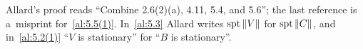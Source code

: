 \begin{remark}
    \label{rem:5.6}
    Allard's proof reads ``Combine 2.6(2)(a), 4.11, 5.4, and 5.6''; the last reference is
    a~misprint for~\ref{al:5.5(1)}. In~\ref{al:5.3} Allard writes $\operatorname{spt} \|V\|$ for $\operatorname{spt} \|C\|$,
    and in~\ref{al:5.2(1)} ``$V$ is stationary'' for ``$B$ is stationary''.
\end{remark}
